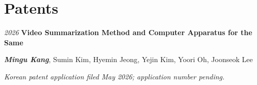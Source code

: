 \section{Patents}

\begin{publicationentry}{\textit{2026}}
    \textbf{Video Summarization Method and Computer Apparatus for the Same}
    \par\vspace{0.05cm}
    {\footnotesize \textbf{\textit{Mingu Kang}}, Sumin Kim, Hyemin Jeong, Yejin Kim, Yoori Oh, Joonseok Lee}
\end{publicationentry}
\vspace{-0.05cm}
\begin{onecolentry}
    {\footnotesize \textit{Korean patent application filed May 2026; application number pending.}}
\end{onecolentry}
